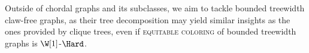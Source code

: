 Outside of chordal graphs and its subclasses, we aim to tackle bounded treewidth claw-free graphs, as their tree decomposition may yield similar insights as the ones provided by clique trees, even if \textsc{equitable coloring} of bounded treewidth graphs is $\W[1]$-$\Hard$.
\begin{comment}
The following diagram outlines the complexity results obtained in this chapter.

\begin{figure}[!htb]
    \centering
    \begin{tikzpicture}[scale=1]
        \GraphInit[unit=3,vstyle=Normal]
        \SetVertexNormal[Shape=circle, FillColor=white, MinSize=2pt]
        \tikzset{VertexStyle/.append style = {shape=rectangle,inner sep = 2pt, outer sep = \outers}}
        \Vertex[a=90, d=1.8,L={Block Graphs ($\NPc$)}]{a}
        \Vertex[a=200, d=4,L={Claw-free Block Graphs ($\P$)}]{b}
        \Vertex[a=-20, d=4,L={Net-free Block Graphs ($\NPc$)}]{c}
        
        \Vertex[a=270, d=4.8,L={\{net,claw\}-free Block Graphs ($\P$)}]{d}
        
        
        \Vertex[a=135, d=5.32,L={Claw-free Chordal Graphs (P)}]{f}
        
        
        \Edge[style={->}](a)(b)
        \Edge[style={->}](a)(c)
        
        \Edge[style={->}](b)(d)
        \Edge[style={->}](c)(d)
        
        
        \Edge[style={->}](f)(b)
        
        
    \end{tikzpicture}
    \hfill
    
    \caption{Complexity results established for \textsc{equitable coloring}.}
    \label{fig:complx_diagram}
\end{figure}

\end{comment}